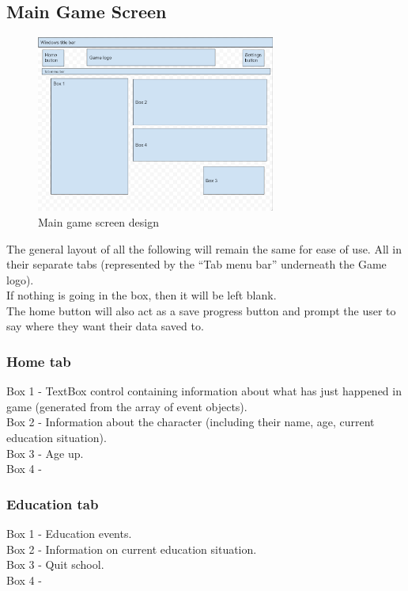 \subsection{Main Game Screen}
\begin{figure}[H]
    \centering
    \includegraphics[width=0.7\textwidth]{images/design/mainGameScreen.png}
    \caption{Main game screen design}
    \label{fig:design-mainGameScreen}
\end{figure}
The general layout of all the following will remain the same for ease of use. All in their separate tabs (represented by the “Tab menu bar” underneath the Game logo).\\
If nothing is going in the box, then it will be left blank.\\
The home button will also act as a save progress button and prompt the user to say where they want their data saved to.

\subsubsection{Home tab}
Box 1 - TextBox control containing information about what has just happened in game (generated from the array of event objects).\\
Box 2 - Information about the character (including their name, age, current education situation).\\
Box 3 - Age up.\\
Box 4 - 

\subsubsection{Education tab}
Box 1 - Education events.\\
Box 2 - Information on current education situation.\\
Box 3 - Quit school.\\
Box 4 - 

